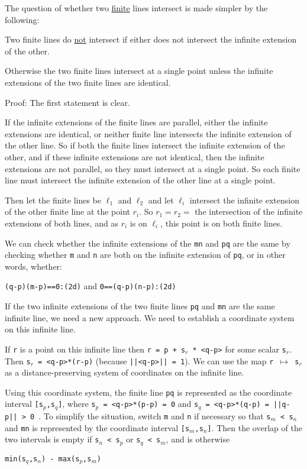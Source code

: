 \documentclass[12pt]{article}
\begin{document}
The question of whether two \underline{finite} lines intersect is made
simpler by the following:
\begin{lemma}
Two finite lines do \underline{not} intersect
if either does not intersect the infinite extension of the other.

Otherwise the two finite lines intersect at a single point unless
the infinite extensions of the two finite lines are identical.
\end{lemma}
\begin{indpar}{0.3in}
Proof: The first statement is clear.

If the infinite extensions of the finite lines are parallel, either
the infinite extensions are identical, or neither finite line
intersects the infinite extension of the other line.
So if both the finite lines intersect the infinite extension of the other,
and if these infinite extensions are not identical, then the
infinite extensions are not parallel, so they must intersect at a
single point.  So each finite line must intersect the infinite extension
of the other line at a single point.

Then let the finite lines be $\ell_1$ and $\ell_2$ and let
$\ell_i$ intersect the infinite extension of the other finite line
at the point $r_i$.  So $r_1=r_2=$ the intersection of the infinite
extensions of both lines, and as $r_i$ is on $\ell_i$, this point is
on both finite lines.
\end{indpar}

We can check whether the infinite extensions of the {\tt mn} and {\tt pq}
are the same by checking whether {\tt m} and {\tt n} are both on
the infinite extension of {\tt pq}, or in other words, whether: \\
\centerline{{\tt (q-p)\WH(m-p)==0:(2d)} and {\tt 0==(q-p)\WH(n-p):(2d)}}

If the two infinite extensions of the two finite lines {\tt pq} and
{\tt mn} are the same
infinite line, we need a new approach.  We need to establish a coordinate
system on this infinite line.

If {\tt r} is a point on this infinite line then
{\tt r = p + s$_r$ * <q-p>} for some scalar {\tt s$_r$}.  Then
{\tt s$_r$ = <q-p>*(r-p)} (because {\tt ||<q-p>|| = 1}).
We can use the map {\tt r $\mapsto$ s$_r$} as a distance-preserving
system of coordinates
on the infinite line.

Using this coordinate system, the finite line {\tt pq} is represented
as the coordinate interval {\tt [s$_p$,s$_q$]}, where
{\tt s$_p$ = <q-p>*(p-p) = 0} and
{\tt s$_q$ = <q-p>*(q-p) = ||q-p|| > 0 }.
To simplify
the situation, switch {\tt m} and {\tt n} if necessary so that
{\tt s$_m$ < s$_n$} and {\tt mn} is represented by the coordinate
interval {\tt [s$_m$,s$_n$]}.  Then the overlap of the two intervals
is empty if {\tt s$_n$ < s$_p$} or {\tt s$_q$ < s$_m$}, and is
otherwise \\
\centerline{\tt min(s$_q$,s$_n$) - max(s$_p$,s$_m$)}
\end{document}

